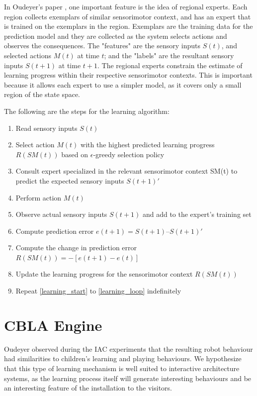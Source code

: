In Oudeyer's paper \cite{Oudeyer2007}, one important feature is the idea of regional experts. Each region collects exemplars of similar sensorimotor context, and has an expert that is trained on the exemplars in the region. Exemplars are the training data for the prediction model and they are collected as the system selects actions and observes the consequences. The "features" are the sensory inputs $S(t)$, and selected actions $M(t)$ at time $t$; and the "labels" are the resultant sensory inputs $S(t+1)$ at time $t+1$. The regional experts constrain the estimate of learning progress within their respective sensorimotor contexts. This is important because it allows each expert to use a simpler model, as it covers only a small region of the state space.  

The following are the steps for the learning algorithm:

\begin{enumerate}
	\item \label{learning_start} Read sensory inputs $S(t)$
	\item Select action $M(t)$ with the highest predicted learning progress $R(SM(t))$ based on $\epsilon$-greedy selection policy
	\item Consult expert specialized in the relevant sensorimotor context SM(t) to predict the expected sensory inputs $S(t+1)'$
	\item Perform action $M(t)$
	\item Observe actual sensory inputs $S(t+1)$ and add to the expert's training set
	\item Compute prediction error $e(t+1) = S(t+1) – S(t+1)'$
	\item Compute the change in prediction error $R(SM(t)) = -[e(t+1) - e(t)]$
	\item Update the learning progress for the sensorimotor context $R(SM(t))$
	\item \label{learning_loop} Repeat \ref{learning_start} to \ref{learning_loop} indefinitely
\end{enumerate}
	

\section{CBLA Engine}

Oudeyer \cite{Oudeyer2005} observed during the IAC experiments that the resulting robot behaviour had similarities to children's learning and playing behaviours. We hypothesize that this type of learning mechanism is well suited to interactive architecture systems, as the learning process itself will generate interesting behaviours and be an interesting feature of the installation to the visitors. 

